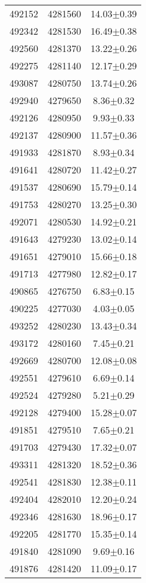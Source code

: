 \begin{center}
\begin{supertabular}{c c c}
492152	 & 	4281560	 & 	14.03$\pm$0.39\\ 
492342	 & 	4281530	 & 	16.49$\pm$0.38\\ 
492560	 & 	4281370	 & 	13.22$\pm$0.26\\ 
492275	 & 	4281140	 & 	12.17$\pm$0.29\\ 
493087	 & 	4280750	 & 	13.74$\pm$0.26\\ 
492940	 & 	4279650	 & 	8.36$\pm$0.32\\ 
492126	 & 	4280950	 & 	9.93$\pm$0.33\\ 
492137	 & 	4280900	 & 	11.57$\pm$0.36\\ 
491933	 & 	4281870	 & 	8.93$\pm$0.34\\ 
491641	 & 	4280720	 & 	11.42$\pm$0.27\\ 
491537	 & 	4280690	 & 	15.79$\pm$0.14\\ 
491753	 & 	4280270	 & 	13.25$\pm$0.30\\ 
492071	 & 	4280530	 & 	14.92$\pm$0.21\\ 
491643	 & 	4279230	 & 	13.02$\pm$0.14\\ 
491651	 & 	4279010	 & 	15.66$\pm$0.18\\ 
491713	 & 	4277980	 & 	12.82$\pm$0.17\\ 
490865	 & 	4276750	 & 	6.83$\pm$0.15\\ 
490225	 & 	4277030	 & 	4.03$\pm$0.05\\ 
493252	 & 	4280230	 & 	13.43$\pm$0.34\\ 
493172	 & 	4280160	 & 	7.45$\pm$0.21\\ 
492669	 & 	4280700	 & 	12.08$\pm$0.08\\ 
492551	 & 	4279610	 & 	6.69$\pm$0.14\\ 
492524	 & 	4279280	 & 	5.21$\pm$0.29\\ 
492128	 & 	4279400	 & 	15.28$\pm$0.07\\ 
491851	 & 	4279510	 & 	7.65$\pm$0.21\\ 
491703	 & 	4279430	 & 	17.32$\pm$0.07\\ 
493311	 & 	4281320	 & 	18.52$\pm$0.36\\ 
492541	 & 	4281830	 & 	12.38$\pm$0.11\\ 
492404	 & 	4282010	 & 	12.20$\pm$0.24\\ 
492346	 & 	4281630	 & 	18.96$\pm$0.17\\ 
492205	 & 	4281770	 & 	15.35$\pm$0.14\\ 
491840	 & 	4281090	 & 	9.69$\pm$0.16\\ 
491876	 & 	4281420	 & 	11.09$\pm$0.17\\ 

\end{supertabular}
\end{center}
